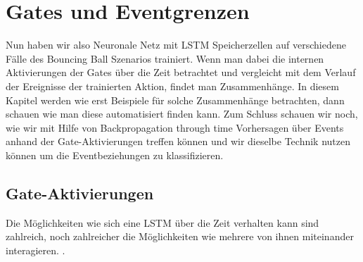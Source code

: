 \chapter{Gates und Eventgrenzen}
\label{ch:untersuchung}
Nun haben wir also Neuronale Netz mit LSTM Speicherzellen auf verschiedene Fälle des Bouncing Ball Szenarios trainiert. Wenn man dabei die internen Aktivierungen der Gates über die Zeit betrachtet und vergleicht mit dem Verlauf der Ereignisse der trainierten Aktion, findet man Zusammenhänge. In diesem Kapitel werden wie erst Beispiele für solche Zusammenhänge betrachten, dann schauen wie man diese automatisiert finden kann. Zum Schluss schauen wir noch, wie wir mit Hilfe von Backpropagation through time Vorhersagen über Events anhand der Gate-Aktivierungen treffen können und wir dieselbe Technik nutzen können um die Eventbeziehungen zu klassifizieren.
\section{Gate-Aktivierungen}
Die Möglichkeiten wie sich eine LSTM über die Zeit verhalten kann sind zahlreich, noch zahlreicher die Möglichkeiten wie mehrere von ihnen miteinander interagieren. \cite{bib:graves}. 





